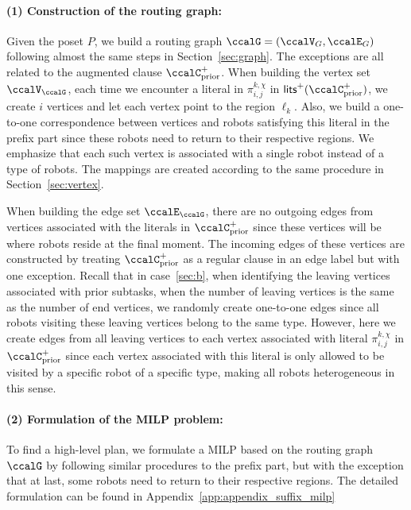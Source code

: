 \documentclass[Afour,sageh,times]{sagej}
\newcounter{mycounter}
\renewcommand{\ap}[3]{\mathcal{\pi}_{{#1},{#2}}^{#3}}
\begin{document}
{{  \paragraph{(1) Construction of the routing graph:} Given the poset $P$, we build a routing graph $\ccalG = (\ccalV_G, \ccalE_G)$ following almost the same steps in Section~\ref{sec:graph}. The exceptions are all related to the augmented clause $\ccalC_{\text{prior}}^+$.   When building the vertex set $\ccalV_\ccalG$, each time we encounter a literal in $\ap{i}{j}{k,\chi}$ in $\mathsf{lits}^+(\ccalC_{\text{prior}}^+)$, we create $i$ vertices and let each vertex point to the region $\ell_k$.  Also, we build a one-to-one correspondence between  vertices and robots satisfying this literal in the prefix part since these robots need to return to their respective regions. We emphasize that each such vertex is associated with a single robot instead of a type of robots.  The mappings are created according to the same  procedure  in Section~\ref{sec:vertex}.

  When  building the edge set $\ccalE_\ccalG$, there are no outgoing edges from  vertices associated with the literals in $\ccalC_{\text{prior}}^+$ since these vertices will be where robots reside at the final moment. The incoming edges of these vertices are constructed by treating $\ccalC_{\text{prior}}^+$ as a regular clause  in an edge label but with one exception.  Recall that in case~\ref{sec:b}, when identifying the leaving vertices  associated with prior subtasks, when the number of leaving vertices is the same as  the number of end vertices, we randomly create   one-to-one edges since all robots visiting these leaving vertices belong to the same type. However, here we create edges from all leaving vertices to each vertex associated with literal $\ap{i}{j}{k,\chi}$ in $\ccalC_{\text{prior}}^+$ since each vertex associated with this literal  is only allowed to be visited by a specific robot of a specific type, making all robots heterogeneous in this sense.
\paragraph{(2) Formulation of the MILP problem:}  To find a high-level plan, we formulate a MILP  based on the routing graph $\ccalG$
by following  similar procedures to the prefix part, but with the exception that at last, some robots need to return to their respective regions. The detailed formulation can be found in Appendix~\ref{app:appendix_suffix_milp}
}}
\end{document}
